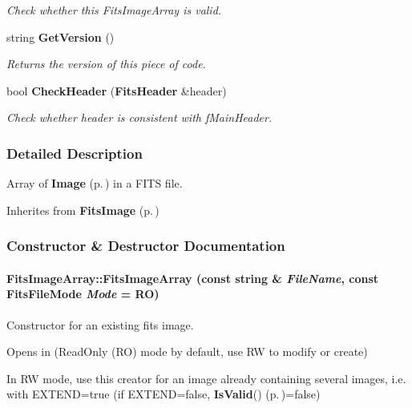 \begin{CompactItemize}
\begin{CompactList}\small\item\em Check whether this Fits\-Image\-Array is valid.\item\end{CompactList}\item 
{}
string {\bf Get\-Version} ()\label{class_fitsimagearray_a12}

\begin{CompactList}\small\item\em Returns the version of this piece of code.\item\end{CompactList}\item 
bool {\bf Check\-Header} ({\bf Fits\-Header} \&header)
\begin{CompactList}\small\item\em Check whether header is consistent with f\-Main\-Header.\item\end{CompactList}\end{CompactItemize}


\subsubsection{Detailed Description}
Array of {\bf Image} {\rm (p.\,\pageref{class_image})} in a FITS file.

Inherites from {\bf Fits\-Image} {\rm (p.\,\pageref{class_fitsimage})} 



\subsubsection{Constructor \& Destructor Documentation}
\paragraph{\setlength{\rightskip}{0pt plus 5cm}Fits\-Image\-Array::Fits\-Image\-Array (const string \& {\em File\-Name}, const Fits\-File\-Mode {\em Mode} = RO)}\hfill\label{class_fitsimagearray_a0}


Constructor for an existing fits image.

\begin{CompactItemize}
\item 
 Opens in (Read\-Only (RO) mode by default, use RW to modify or create) \item 
 In RW mode, use this creator for an image already containing several images, i.e. with EXTEND=true (if EXTEND=false, {\bf Is\-Valid}() {\rm (p.\,\pageref{class_fitsimagearray_a11})}=false) \end{CompactItemize}
